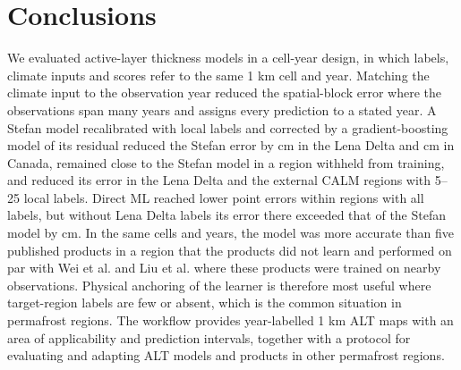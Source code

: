 \section{Conclusions}\label{sec:conclusions}
We evaluated active-layer thickness models in a cell-year design, in which labels, climate inputs and scores refer to the same 1 km cell and year. Matching the climate input to the observation year reduced the spatial-block error where the observations span many years and assigns every prediction to a stated year. A Stefan model recalibrated with local labels and corrected by a gradient-boosting model of its residual reduced the Stefan error by \ndrefLeblkRoabs{} cm in the Lena Delta and \ndrefCablkRoabs{} cm in Canada, remained close to the Stefan model in a region withheld from training, and reduced its error in the Lena Delta and the external CALM regions with 5--25 local labels. Direct ML reached lower point errors within regions with all labels, but without Lena Delta labels its error there exceeded that of the Stefan model by \ntlLeDszeroabs{} cm. In the same cells and years, the model was more accurate than five published products in a region that the products did not learn and performed on par with Wei et al. and Liu et al. where these products were trained on nearby observations. Physical anchoring of the learner is therefore most useful where target-region labels are few or absent, which is the common situation in permafrost regions. The workflow provides year-labelled 1 km ALT maps with an area of applicability and prediction intervals, together with a protocol for evaluating and adapting ALT models and products in other permafrost regions.
